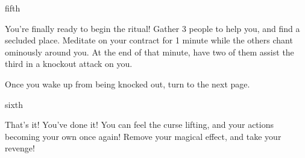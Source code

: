\documentclass[greennotebook]{NeptuneBall}
\begin{document}
\begin{page}{fifth}

You're finally ready to begin the ritual! Gather 3 people to help you, and find a secluded place. Meditate on your contract for 1 minute while the others chant ominously around you. At the end of that minute, have two of them assist the third in a knockout attack on you.

Once you wake up from being knocked out, turn to the next page.

\end{page}

\begin{page}{sixth}

That's it! You've done it! You can feel the curse lifting, and your actions becoming your own once again! Remove your \iIdentityProtectionSpell{} magical effect, and take your revenge!

\end{page}

\endnotebook
\end{document}
